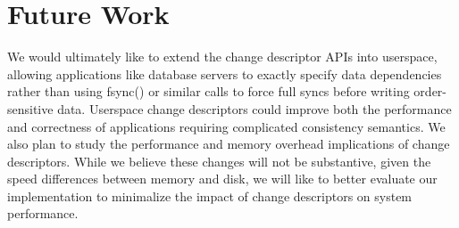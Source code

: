 \preparagraphspacing{}
\section*{Future Work}
\label{sec:future}

We would ultimately like to extend the change descriptor APIs into
userspace, allowing applications like database servers to exactly
specify data dependencies rather than using fsync() or similar calls
to force full syncs before writing order-sensitive data. Userspace
change descriptors could improve both the performance and correctness
of applications requiring complicated consistency semantics. We also
plan to study the performance and memory overhead implications of
change descriptors. While we believe these changes will not be substantive,
given the speed differences between memory and disk, we will like to
better evaluate our implementation to minimalize the impact of change
descriptors on system performance.
